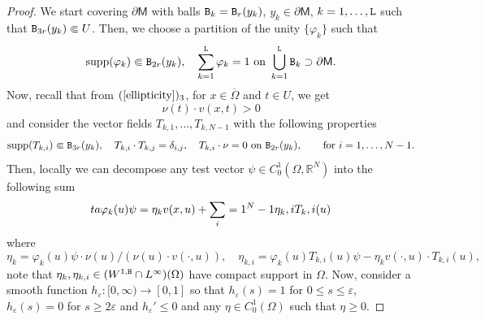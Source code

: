 \documentclass[a4paper]{amsart}
\theoremstyle{plain}  %
\numberwithin{equation}{section}
\newcommand{\R}{\mathbb{R}}
\newcommand{\mm}{\mathsf{M}}
\newcommand{\tx}[1]{\textnormal{\texttt{#1}}}
\def\eqn#1$$#2$${\begin{equation}\label#1#2\end{equation}}
\begin{document}
\begin{proof}
We start covering $\partial \mm$ with balls $\tx{B}_k = \tx{B}_r(y_k)$, $y_k \in \partial \mm$, $k =1,\dots,\tx{L}$ such that $\tx{B}_{3r}(y_k) \Subset U$. Then, we choose a partition of the unity $\{ \varphi_k\}$ such that
$$ \text{supp}(\varphi_k) \Subset \tx{B}_{2r}(y_k), \quad \sum_{k=1}^\tx{L} \varphi_k =1 \text{ on } \bigcup_{k=1}^\tx{L} \tx{B}_k \supset \partial \mm.$$
Now, recall that from  $(\ref{ellipticity})_{3}$, for $x \in \overline{\Omega}$ and $t  \in U$, we get
$$ \nu(t)\cdot v(x,t) >0$$ and consider the vector fields $T_{k,1}, \dots, T_{k,N-1}$ with the following properties
$$ \text{supp}(T_{k,i}) \Subset \tx{B}_{3r}(y_k), \quad T_{k,i} \cdot T_{k,j} = \delta_{i,j}, \quad T_{k,i} \cdot \nu = 0 \text{ on } \tx{B}_{2r}(y_k), \qquad \text{for } i=1,\dots, N-1.$$
Then, locally we can decompose any test vector $\psi \in C^{1}_0(\Omega, \R^N)$ into the following sum
\eqn{eta}
$$ \varphi_k (u) \psi = \eta_k v(x,u) + \sum_{i=1}^{N-1} \eta_{k,i} T_{k,i} (u)$$
where
$$ \eta_k = \varphi_k (u) \psi \cdot \nu(u)/(\nu(u)\cdot v(\cdot,u)), \quad \eta_{k,i} = \varphi_k(u) T_{k,i}(u) \psi - \eta_k v(\cdot,u) \cdot T_{k,i}(u),$$
note that $\eta_k, \eta_{k,i} \in (W^{1,\tx{H}} \cap L^{\infty})(\Omega)$ have compact support in $\Omega$. Now, consider a smooth function $h_\varepsilon: [0,\infty) \to [0,1]$  so that $h_\varepsilon (s)=1$ for $0\leq s \leq \varepsilon$, $h_\varepsilon(s)=0$ for $s \geq 2\varepsilon$ and $h_\varepsilon' \leq 0$ and any $\eta \in C^{1}_0(\Omega)$ such that $\eta \geq 0$.


\end{proof}
\end{document}
